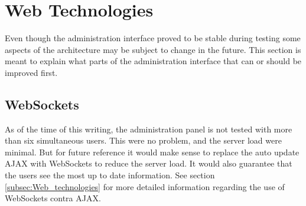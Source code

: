 \section{Web Technologies}
Even though the administration interface proved to be stable during testing some aspects of the architecture may be subject to change in the future. This section is meant to explain what parts of the administration interface that can or should be improved first. 

\subsection{WebSockets}
As of the time of this writing, the administration panel is not tested with more than six simultaneous users. This were no problem, and the server load were minimal. But for future reference it would make sense to replace the auto update AJAX with WebSockets to reduce the server load. It would also guarantee that the users see the most up to date information. See section \ref{subsec:Web_technologies} for more detailed information regarding the use of WebSockets contra AJAX. 
